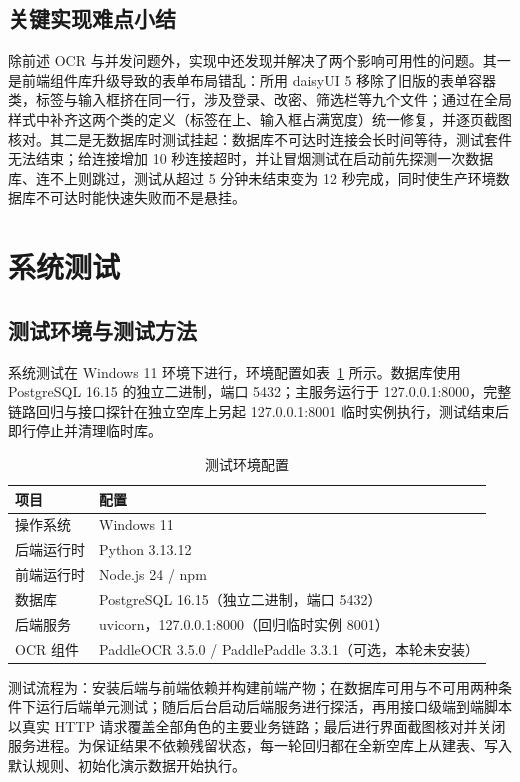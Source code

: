 \documentclass[12pt,a4paper]{ctexart}
\begin{document}
\subsection{关键实现难点小结}

除前述 OCR 与并发问题外，实现中还发现并解决了两个影响可用性的问题。其一是前端组件库升级导致的表单布局错乱：所用 daisyUI 5 移除了旧版的表单容器类，标签与输入框挤在同一行，涉及登录、改密、筛选栏等九个文件；通过在全局样式中补齐这两个类的定义（标签在上、输入框占满宽度）统一修复，并逐页截图核对。其二是无数据库时测试挂起：数据库不可达时连接会长时间等待，测试套件无法结束；给连接增加 10 秒连接超时，并让冒烟测试在启动前先探测一次数据库、连不上则跳过，测试从超过 5 分钟未结束变为 12 秒完成，同时使生产环境数据库不可达时能快速失败而不是悬挂。

\clearpage

\section{系统测试}

\subsection{测试环境与测试方法}

系统测试在 Windows 11 环境下进行，环境配置如表~\ref{tab:testenv} 所示。数据库使用 PostgreSQL 16.15 的独立二进制，端口 5432；主服务运行于 127.0.0.1:8000，完整链路回归与接口探针在独立空库上另起 127.0.0.1:8001 临时实例执行，测试结束后即行停止并清理临时库。

\begin{table}[H]
  \centering
  \caption{测试环境配置}
  \label{tab:testenv}
  \begin{tabular}{ll}
    \toprule
    项目 & 配置 \\
    \midrule
    操作系统 & Windows 11 \\
    后端运行时 & Python 3.13.12 \\
    前端运行时 & Node.js 24 / npm \\
    数据库 & PostgreSQL 16.15（独立二进制，端口 5432） \\
    后端服务 & uvicorn，127.0.0.1:8000（回归临时实例 8001） \\
    OCR 组件 & PaddleOCR 3.5.0 / PaddlePaddle 3.3.1（可选，本轮未安装） \\
    \bottomrule
  \end{tabular}
\end{table}

测试流程为：安装后端与前端依赖并构建前端产物；在数据库可用与不可用两种条件下运行后端单元测试；随后后台启动后端服务进行探活，再用接口级端到端脚本以真实 HTTP 请求覆盖全部角色的主要业务链路；最后进行界面截图核对并关闭服务进程。为保证结果不依赖残留状态，每一轮回归都在全新空库上从建表、写入默认规则、初始化演示数据开始执行。
\end{document}
